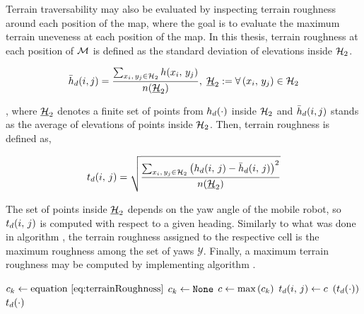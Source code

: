 Terrain traversability may also be evaluated by inspecting terrain roughness around each position of the map, where the goal is to evaluate the maximum terrain uneveness at each position of the map. In this thesis, terrain roughness at each position of $\mathcal{M}$ is defined as the standard deviation of elevations inside $\mathcal{H}_2$.

\begin{equation}
	\bar{h}_d(i, j) = \frac{\sum_{x_i,\,y_j \in \mathcal{H}_2} h(x_i, \, y_j)}{n(\underline{\mathcal{H}}_2)},\; \underline{\mathcal{H}}_2 :=  \forall \left( x_i,\, y_j \right) \in \mathcal{H}_2
	\label{eq:averageHeight}
\end{equation}

\noindent, where $\underline{\mathcal{H}}_2$ denotes a finite set of points from $h_d(\cdot)$ inside $\mathcal{H}_2$ and $\bar{h}_d(i, j)$ stands as the average of elevations of points inside $\mathcal{H}_2$. Then, terrain roughness is defined as,

\begin{equation}
	t_d(i,\,j) = \sqrt{\frac{\sum_{x_i,\,y_j \in \mathcal{H}_2} \left( h_d(i,\,j) - \bar{h}_d(i,\,j) \right)^2 }{n(\underline{\mathcal{H}}_2)}}
	\label{eq:terrainRoughness}
\end{equation}

The set of points inside $\underline{\mathcal{H}}_2$ depends on the yaw angle of the mobile robot, so $t_d(i,\,j)$ is computed with respect to a given heading. Similarly to what was done in algorithm , the terrain roughness assigned to the respective cell is the maximum roughness among the set of yaws $\mathcal{Y}$. Finally, a maximum terrain roughness may be computed by implementing algorithm .

\begin{algorithm}[H]
	\caption{\footnotesize \textsc{MAPROUGHNESS}}\label{alg:maxRoughnessMap}
	\centering
	\footnotesize
	\begin{algorithmic}[1]
	 
	\State $c_k \gets \text{equation \eqref{eq:terrainRoughness}}$
	\EndFor
	\Else
	\State $c_k \gets \texttt{None}$
	\EndIf
	\State $c \gets \text{max}\left( c_k \right)$ 
	\State $t_d(i,\, j) \gets c$
	\EndFor
	\State {} $\left( t_d(\cdot) \right)$
	\State \Return $t_d(\cdot)$ 
	\EndFunction
	\end{algorithmic}
\end{algorithm}


